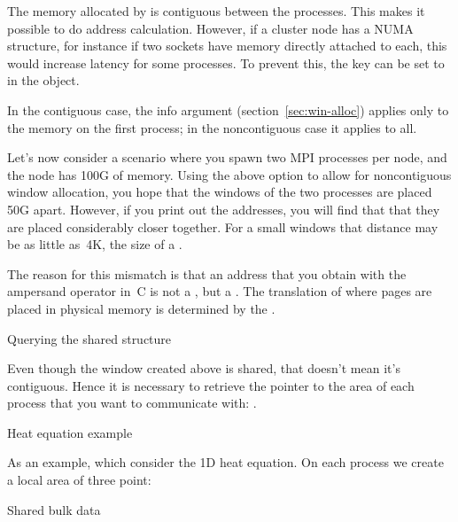 
The memory allocated by  is
contiguous between the processes. This makes it possible to do address
calculation. However, if a cluster node has a \ac{NUMA} structure, for
instance if two sockets have memory directly attached to each, this
would increase latency for some processes. To prevent this, the key
 can be set to  in the
 object.
\begin{mpifour}
  In the contiguous case, the 
  info argument
  (section~\ref{sec:win-alloc})
  applies only to the memory on the first process;
  in the noncontiguous case it applies to all.
\end{mpifour}


Let's now consider a scenario where you spawn two MPI processes per node,
and the node has 100G of memory.
Using the above option to allow for noncontiguous window allocation,
you hope that the windows of the two processes are placed 50G apart.
However, if you print out the addresses, you will find that that they
are placed considerably closer together. For a small windows that distance
may be as little as~4K, the size of a .

The reason for this mismatch is that an address that you obtain with
the ampersand operator in~C is not a
, but a
.
The translation of where pages are placed in physical memory
is determined by the .


 {Querying the shared structure}

Even though the window created above is shared, that doesn't mean it's
contiguous. Hence it is necessary to retrieve the pointer to the area
of each process that you want to communicate with:
.


 {Heat equation example}

As an example, which consider the 1D heat equation. On each process we
create a local area of three point:
%

 {Shared bulk data}

